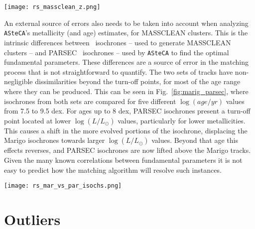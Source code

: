 \documentclass{aa}
\begin{document}
\begin{appendix}
\begin{figure*}
\texttt{[image: rs\_massclean\_z.png]}
\caption{\texttt{ASteCA} metallicity estimates for each mass used to generate
MASSCLEAN clusters. Colors are associated to $\log(age/yr)$ differences, shown
in the colorbars to the right. The green dashed horizontal line is the $\Delta
[Fe/H]{=}0$ line, shown as reference.}
\label{fig:massclean_z}
\end{figure*}

An external source of errors also needs to be taken into account when analyzing
\texttt{ASteCA}'s metallicity (and age) estimates, for MASSCLEAN clusters.
%
This is the intrinsic differences between~\cite{Marigo_2008} isochrones --
used to generate MASSCLEAN clusters -- and PARSEC~\citep{Bressan_2012}
isochrones -- used by \texttt{ASteCA} to find the optimal fundamental
parameters. These differences are a source of error in the matching
process that is not straightforward to quantify.
%
The two sets of tracks have non-negligible dissimilarities beyond the turn-off
points, for most of the age range where they can be produced. This can be seen
in Fig.~\ref{fig:marig_parsec}, where isochrones from both sets are compared for
five different $\log(age/yr)$ values from 7.5 to 9.5 dex.
%
For ages up to 8 dex, PARSEC isochrones present a turn-off point located at
lower $\log(L/L_{\odot})$ values, particularly for lower metallicities. This
causes a shift in the more evolved portions of the isochrone, displacing the
Marigo isochrones towards larger $\log(L/L_{\odot})$ values.
%
Beyond that age this effects reverses, and PARSEC isochrones are now lifted
above the Marigo tracks. Given the many known correlations between fundamental
parameters it is not easy to predict how the matching algorithm will resolve
such instances.

\begin{figure*}
\texttt{[image: rs\_mar\_vs\_par\_isochs.png]}
\caption{\cite{Marigo_2008} versus PARSEC~\citep{Bressan_2012} isochrones, for
different metallicities and ages.}
\label{fig:marig_parsec}
\end{figure*}





\section{Outliers}
\label{apdx:outliers}


\end{appendix}
\end{document}
